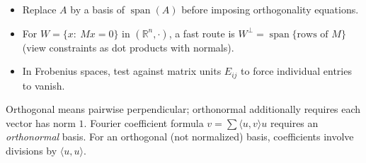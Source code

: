 \begin{examtip}[title={Exam Focus: orthogonal complement computations}]
\begin{itemize}[leftmargin=*]
\item Replace $A$ by a basis of $\operatorname{span}(A)$ before imposing orthogonality equations.
\item For $W=\{x:\ Mx=0\}$ in $(\mathbb{R}^n,\cdot)$, a fast route is $W^\perp=\operatorname{span}\{\text{rows of }M\}$ (view constraints as dot products with normals).
\item In Frobenius spaces, test against matrix units $E_{ij}$ to force individual entries to vanish.
\end{itemize}
\end{examtip}

\begin{commonmistake}[title={Common Mistake: “orthogonal” vs.\ “orthonormal”}]
Orthogonal means pairwise perpendicular; orthonormal additionally requires each vector has norm $1$.
Fourier coefficient formula $v=\sum \langle u,v\rangle u$ requires an \emph{orthonormal} basis.
For an orthogonal (not normalized) basis, coefficients involve divisions by $\langle u,u\rangle$.
\end{commonmistake}
